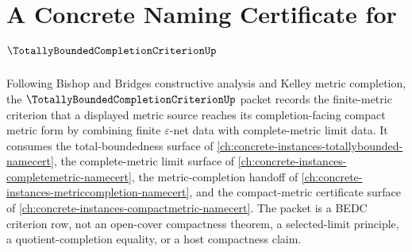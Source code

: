 \chapter{A Concrete Naming Certificate for $\TotallyBoundedCompletionCriterionUp$}
\label{ch:concrete-instances-totally-bounded-completion-criterion-namecert}

Following Bishop and Bridges constructive analysis and Kelley metric completion, the $\TotallyBoundedCompletionCriterionUp$ packet records the finite-metric criterion that a displayed metric source reaches its completion-facing compact metric form by combining finite $\varepsilon$-net data with complete-metric limit data. It consumes the total-boundedness surface of \autoref{ch:concrete-instances-totallybounded-namecert}, the complete-metric limit surface of \autoref{ch:concrete-instances-completemetric-namecert}, the metric-completion handoff of \autoref{ch:concrete-instances-metriccompletion-namecert}, and the compact-metric certificate surface of \autoref{ch:concrete-instances-compactmetric-namecert}. The packet is a BEDC criterion row, not an open-cover compactness theorem, a selected-limit principle, a quotient-completion equality, or a host compactness claim.

